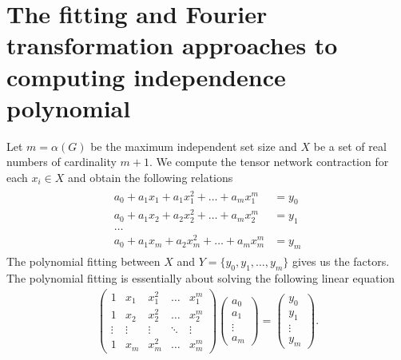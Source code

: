 \documentclass[review,onefignum,onetabnum]{siamart190516}
\newcommand{\<}{\langle}
\renewcommand{\>}{\rangle}
\begin{document}
\section{The fitting and Fourier transformation approaches to computing independence polynomial}\label{app:fft}
Let $m=\alpha(G)$ be the maximum independent set size and $X$ be a set of real numbers of cardinality $m+1$.
We compute the tensor network contraction for each $x_i \in X$ and obtain the following relations
\begin{align}
    \begin{split}
a_0 + a_1 x_1 + a_1 x_1^2 + \ldots + a_m x_1^m &= y_0\\
a_0 + a_1 x_2 + a_2 x_2^2 + \ldots + a_m x_2^m &= y_1\\
\ldots&\\
a_0 + a_1 x_m + a_2 x_m^2 + \ldots + a_m x_m^m& = y_m
    \end{split}
\end{align}
The polynomial fitting between $X$ and $Y = \{y_0, y_1, \ldots, y_m\}$ gives us the factors.
The polynomial fitting is essentially about solving the following linear equation
\begin{align}
\left(\begin{matrix}
1 & x_1 & x_1^2 & \ldots & x_1^m \\
1 & x_2 & x_2^2 & \ldots & x_2^m \\
\vdots & \vdots & \vdots &\ddots & \vdots \\
1 & x_m & x_m^2 & \ldots & x_m^m
\end{matrix}\right)
\left(\begin{matrix}
a_0 \\ a_1 \\ \vdots \\ a_m
\end{matrix}\right)
= \left(\begin{matrix}
y_0 \\ y_1 \\ \vdots \\ y_m
\end{matrix}\right).\label{eq:lineareq}
\end{align}
\end{document}
